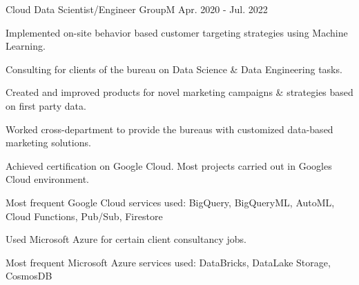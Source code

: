 


\begin{cventries}


\cventry
{Cloud Data Scientist/Engineer} %
{GroupM} %
{} %
{Apr. 2020 - Jul. 2022} %
{ %
\begin{cvitems}
\item {Implemented on-site behavior based customer targeting strategies using Machine Learning.}
\item {Consulting for clients of the bureau on Data Science \& Data Engineering tasks.}
\item {Created and improved products for novel marketing campaigns \& strategies based on first party data.}
\item {Worked cross-department to provide the bureaus with customized data-based marketing solutions.}
\item {Achieved certification on Google Cloud. Most projects carried out in Googles Cloud environment.}
\item {Most frequent Google Cloud services used: BigQuery, BigQueryML, AutoML, Cloud Functions, Pub/Sub, Firestore}
\item {Used Microsoft Azure for certain client consultancy jobs.}
\item {Most frequent Microsoft Azure services used: DataBricks, DataLake Storage, CosmosDB}
\end{cvitems}
}



\end{cventries}
